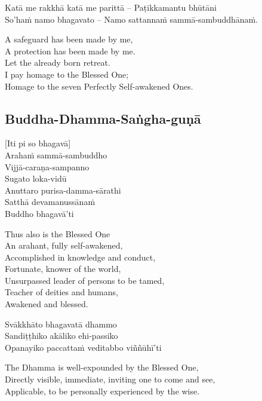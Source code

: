 Katā me rakkhā katā me parittā – Paṭikkamantu bhūtāni\\
So’haṁ namo bhagavato – Namo sattannaṁ sammā-sambuddhānaṁ.

\begin{english}
  A safeguard has been made by me,\\
  A protection has been made by me.\\
  Let the already born retreat.\\
  I pay homage to the Blessed One;\\
  Homage to the seven Perfectly Self-awakened Ones.
\end{english}

\suttaRef{[AN 4.67]}

\subsection{Buddha-Dhamma-Saṅgha-guṇā}
\label{buddha-dhamma-sangha-guna}
[Iti pi so bhagavā]\\
Arahaṁ sammā-sambuddho\\
Vijjā-caraṇa-sampanno\\
Sugato loka-vidū\\
Anuttaro purisa-damma-sārathi\\
Satthā devamanussānaṁ\\
Buddho bhagavā’ti

\begin{english}
  Thus also is the Blessed One\\
  An arahant, fully self-awakened,\\
  Accomplished in knowledge and conduct,\\
  Fortunate, knower of the world,\\
  Unsurpassed leader of persons to be tamed,\\
  Teacher of deities and humans,\\
  Awakened and blessed.
\end{english}

Svākkhāto bhagavatā dhammo\\
Sandiṭṭhiko akāliko ehi-passiko\\
Opanayiko paccattaṁ veditabbo viññūhī’ti

\begin{english}
  The Dhamma is well-expounded by the Blessed One,\\
  Directly visible, immediate, inviting one to come and see,\\
  Applicable, to be personally experienced by the wise.
\end{english}

